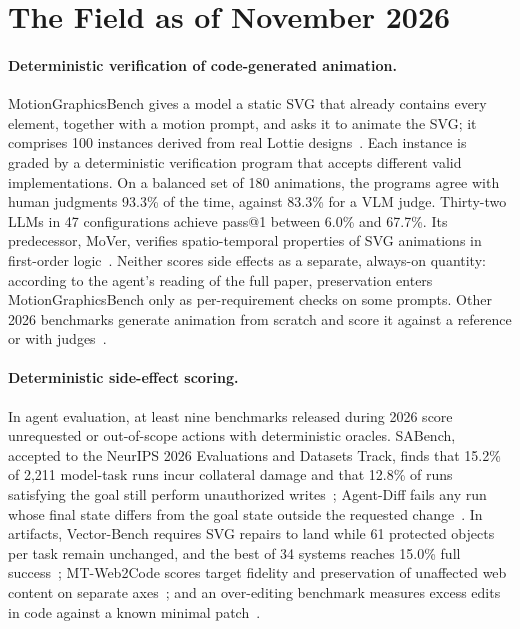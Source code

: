 \documentclass[11pt]{article}
\begin{document}
\section{The Field as of November 2026}

\paragraph{Deterministic verification of code-generated animation.} MotionGraphicsBench gives a model a static SVG that already contains every element, together with a motion prompt, and asks it to animate the SVG; it comprises 100 instances derived from real Lottie designs~\citep{ma2026motiongraphicsbench}. Each instance is graded by a deterministic verification program that accepts different valid implementations. On a balanced set of 180 animations, the programs agree with human judgments 93.3\% of the time, against 83.3\% for a VLM judge. Thirty-two LLMs in 47 configurations achieve pass@1 between 6.0\% and 67.7\%. Its predecessor, MoVer, verifies spatio-temporal properties of SVG animations in first-order logic~\citep{ma2025mover}. Neither scores side effects as a separate, always-on quantity: according to the agent's reading of the full paper, preservation enters MotionGraphicsBench only as per-requirement checks on some prompts. Other 2026 benchmarks generate animation from scratch and score it against a reference or with judges~\citep{zhang2026animwebbench,diao2026vibevideobench,wang2026simuscene}.

\paragraph{Deterministic side-effect scoring.} In agent evaluation, at least nine benchmarks released during 2026 score unrequested or out-of-scope actions with deterministic oracles. SABench, accepted to the NeurIPS 2026 Evaluations and Datasets Track, finds that 15.2\% of 2{,}211 model-task runs incur collateral damage and that 12.8\% of runs satisfying the goal still perform unauthorized writes~\citep{huang2026sabench}; Agent-Diff fails any run whose final state differs from the goal state outside the requested change~\citep{pysklo2026agentdiff}. In artifacts, Vector-Bench requires SVG repairs to land while 61 protected objects per task remain unchanged, and the best of 34 systems reaches 15.0\% full success~\citep{gupta2026vectorbench}; MT-Web2Code scores target fidelity and preservation of unaffected web content on separate axes~\citep{li2026mtweb2code}; and an over-editing benchmark measures excess edits in code against a known minimal patch~\citep{zhu2026overediting}.
\end{document}
